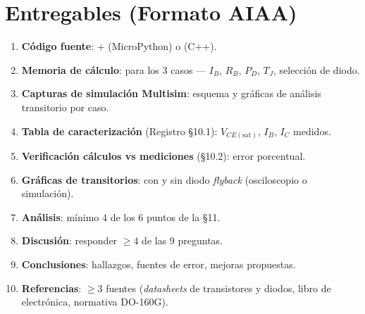 \documentclass[11pt]{article}
\begin{document}
\section{Entregables (Formato AIAA)}
\begin{enumerate}
  \item \textbf{Código fuente}:  + 
        (MicroPython) o  (C++).
  \item \textbf{Memoria de cálculo}: para los 3 casos — $I_B$, $R_B$, $P_D$, $T_J$,
        selección de diodo.
  \item \textbf{Capturas de simulación Multisim}: esquema y gráficas de análisis
        transitorio por caso.
  \item \textbf{Tabla de caracterización} (Registro \S10.1): $V_{CE(\text{sat})}$,
        $I_B$, $I_C$ medidos.
  \item \textbf{Verificación cálculos vs mediciones} (\S10.2): error porcentual.
  \item \textbf{Gráficas de transitorios}: con y sin diodo \emph{flyback} (osciloscopio
        o simulación).
  \item \textbf{Análisis}: mínimo 4 de los 6 puntos de la \S11.
  \item \textbf{Discusión}: responder $\ge 4$ de las 9 preguntas.
  \item \textbf{Conclusiones}: hallazgos, fuentes de error, mejoras propuestas.
  \item \textbf{Referencias}: $\ge 3$ fuentes (\emph{datasheets} de transistores y
        diodos, libro de electrónica, normativa DO-160G).
\end{enumerate}

\end{document}
